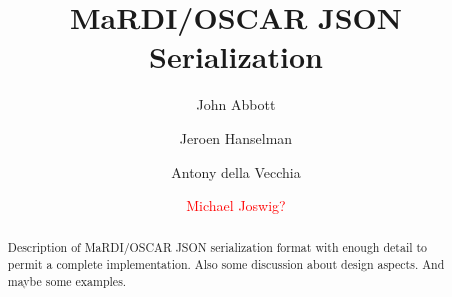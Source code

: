 \documentclass{article}
\def\red#1{\textcolor{red}{#1}}
\begin{document}
\renewcommand*{\today}{2024-07-01} %


\title{MaRDI/OSCAR JSON Serialization}

\author{
  John Abbott%
  \and
  Jeroen Hanselman%
  \and
  Antony della Vecchia%
\and \red{Michael Joswig?}
}
%
%
%
\maketitle              %


\begin{abstract}
  Description of MaRDI/OSCAR JSON serialization format with enough detail
  to permit a complete implementation.
  Also some discussion about design aspects.  And maybe some examples.
\end{abstract}






\end{document}
